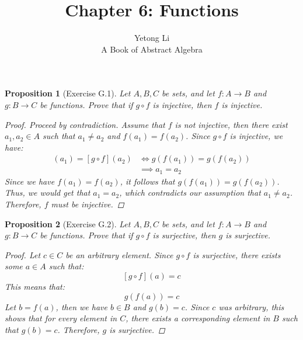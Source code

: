 \documentclass[12pt]{article}
\newtheorem{proposition}{Proposition}
\begin{document}

\title{Chapter 6: Functions}
\author{Yetong Li \\ A Book of Abstract Algebra}

\maketitle


\begin{proposition}[Exercise G.1]
  Let $A, B, C$ be sets, and let $f: A \to B$ and $g: B \to C$ be functions.
  Prove that if $g \circ f$ is injective, then $f$ is injective.
  \begin{proof}
    Proceed by contradiction.
    Assume that $f$ is not injective, then there exist $a_1, a_2 \in A$ such that $a_1 \neq a_2$ and $f(a_1) = f(a_2)$.
    Since $g \circ f$ is injective, we have:
    \begin{align*}
      [g \circ f](a_1) = [g \circ f](a_2) & \iff g(f(a_1)) = g(f(a_2)) \\
                                          & \implies a_1 = a_2
    \end{align*}
    Since we have $f(a_1) = f(a_2)$, it follows that $g(f(a_1)) = g(f(a_2))$.
    Thus, we would get that $a_1 = a_2$, which contradicts our assumption that $a_1 \neq a_2$.
    Therefore, $f$ must be injective.
  \end{proof}
\end{proposition}


\begin{proposition}[Exercise G.2]
  Let $A, B, C$ be sets, and let $f: A \to B$ and $g: B \to C$ be functions.
  Prove that if $g \circ f$ is surjective, then $g$ is surjective.
  \begin{proof}
    Let $c \in C$ be an arbitrary element.
    Since $g \circ f$ is surjective, there exists some $a \in A$ such that:
    \[
      [g \circ f](a) = c
    \]
    This means that:
    \[
      g(f(a)) = c
    \]
    Let $b = f(a)$, then we have $b \in B$ and $g(b) = c$.
    Since $c$ was arbitrary, this shows that for every element in $C$, there exists a corresponding element in $B$ such that $g(b) = c$.
    Therefore, $g$ is surjective.
  \end{proof}
\end{proposition}


\end{document}
